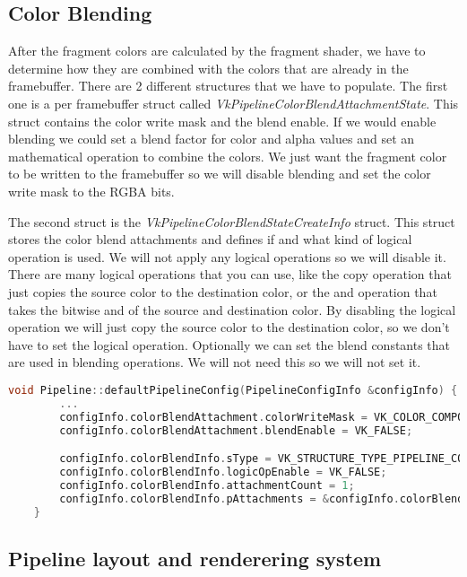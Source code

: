 \documentclass[12pt]{report} \usepackage{preamble}
\begin{document}
\subsection{Color Blending}

After the fragment colors are calculated by the fragment shader, we have to determine how they are combined with the colors
that are already in the framebuffer. There are 2 different structures that we have to populate. The first one is a per
framebuffer struct called \textit{VkPipelineColorBlendAttachmentState}. This struct contains the color write mask and the
blend enable. If we would enable blending we could set a blend factor for color and alpha values and set
an mathematical operation to combine the colors. We just want the fragment color to be written to the framebuffer
so we will disable blending and set the color write mask to the RGBA bits.

The second struct is the \textit{VkPipelineColorBlendStateCreateInfo} struct. This struct stores the color blend attachments
and defines if and what kind of logical operation is used. We will not apply any logical operations so we will disable it.
There are many logical operations that you can use, like the copy operation that just copies the source color to the
destination color, or the and operation that takes the bitwise and of the source and destination color. By disabling the
logical operation we will just copy the source color to the destination color, so we don't have to set the logical operation.
Optionally we can set the blend constants that are used in blending operations. We will not need this so we will not set it.

\begin{lstlisting}[language=C++]
void Pipeline::defaultPipelineConfig(PipelineConfigInfo &configInfo) {
		...
		configInfo.colorBlendAttachment.colorWriteMask = VK_COLOR_COMPONENT_R_BIT | VK_COLOR_COMPONENT_G_BIT | VK_COLOR_COMPONENT_B_BIT | VK_COLOR_COMPONENT_A_BIT;
		configInfo.colorBlendAttachment.blendEnable = VK_FALSE;

		configInfo.colorBlendInfo.sType = VK_STRUCTURE_TYPE_PIPELINE_COLOR_BLEND_STATE_CREATE_INFO;
		configInfo.colorBlendInfo.logicOpEnable = VK_FALSE;
		configInfo.colorBlendInfo.attachmentCount = 1;
		configInfo.colorBlendInfo.pAttachments = &configInfo.colorBlendAttachment;
	}
\end{lstlisting}

\subsection{Pipeline layout and renderering system}
\end{document}
